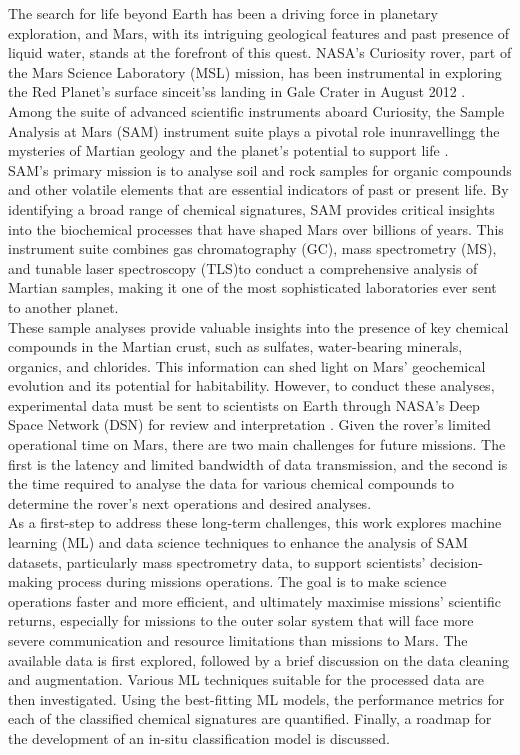 The search for life beyond Earth has been a driving force in planetary exploration, and Mars, with its intriguing geological features and past presence of liquid water, stands at the forefront of this quest. NASA's Curiosity rover, part of the Mars Science Laboratory (MSL) mission, has been instrumental in exploring the Red Planet's surface sinceit'ss landing in Gale Crater in August 2012 \citep{bogue2012mars, vasavada2022mission}. Among the suite of advanced scientific instruments aboard Curiosity, the Sample Analysis at Mars (SAM) instrument suite plays a pivotal role inunravellingg the mysteries of Martian geology and the planet's potential to support life \citep{SAMPAPER_2012}.\\

SAM's primary mission is to analyse soil and rock samples for organic compounds and other volatile elements that are essential indicators of past or present life. By identifying a broad range of chemical signatures, SAM provides critical insights into the biochemical processes that have shaped Mars over billions of years. This instrument suite combines gas chromatography (GC), mass spectrometry (MS), and tunable laser spectroscopy (TLS)to conduct a comprehensive analysis of Martian samples, making it one of the most sophisticated laboratories ever sent to another planet.\\ 

These sample analyses provide valuable insights into the presence of key chemical compounds in the Martian crust, such as sulfates, water-bearing minerals, organics, and chlorides. This information can shed light on Mars' geochemical evolution and its potential for habitability. However, to conduct these analyses, experimental data must be sent to scientists on Earth through NASA's Deep Space Network (DSN) for review and interpretation \citep{sarkar2011survey}. Given the rover's limited operational time on Mars, there are two main challenges for future missions. The first is the latency and limited bandwidth of data transmission, and the second is the time required to analyse the data for various chemical compounds to determine the rover's next operations and desired analyses. \\

As a first-step to address these long-term challenges, this work explores machine learning (ML) and data science techniques to enhance the analysis of SAM datasets, particularly mass spectrometry data, to support scientists’ decision-making process during missions operations. The goal is to make science operations faster and more efficient, and ultimately maximise missions’ scientific returns, especially for missions to the outer solar system that will face more severe communication and resource limitations than missions to Mars. The available data is first explored, followed by a brief discussion on the data cleaning and augmentation. Various ML techniques suitable for the processed data are then investigated. Using the best-fitting ML models, the performance metrics for each of the classified chemical signatures are quantified. Finally, a roadmap for the development of an in-situ classification model is discussed.

